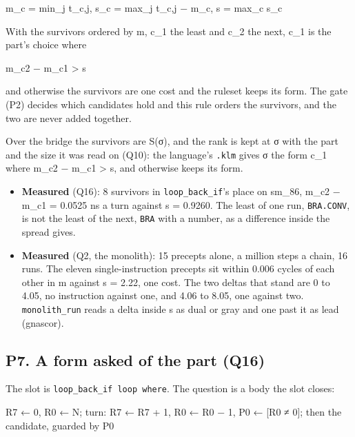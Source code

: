 m\_\allowbreak{}c = min\_\allowbreak{}j t\_\allowbreak{}c,j,  s\_\allowbreak{}c = max\_\allowbreak{}j t\_\allowbreak{}c,j − m\_\allowbreak{}c,  s = max\_\allowbreak{}c s\_\allowbreak{}c

With the survivors ordered by m, c\_\allowbreak{}1 the least and c\_\allowbreak{}2 the next, c\_\allowbreak{}1 is the part's choice where

m\_\allowbreak{}c2 − m\_\allowbreak{}c1 > s

and otherwise the survivors are one cost and the ruleset keeps its form. The gate (P2) decides which candidates hold and this rule orders the survivors, and the two are never added together.

Over the bridge the survivors are S(σ), and the rank is kept at σ with the part and the size it was read on (Q10): the language's \texttt{.\allowbreak{}klm} gives σ the form c\_\allowbreak{}1 where m\_\allowbreak{}c2 − m\_\allowbreak{}c1 > s, and otherwise keeps its form.

\begin{itemize}
\item \textbf{Measured} (Q16): 8 survivors in \texttt{loop\_\allowbreak{}back\_\allowbreak{}if}'s place on sm\_\allowbreak{}86, m\_\allowbreak{}c2 − m\_\allowbreak{}c1 = 0.0525 ns a turn against s = 0.9260. The least of one run, \texttt{BRA.\allowbreak{}CONV}, is not the least of the next, \texttt{BRA} with a number, as a difference inside the spread gives.
\item \textbf{Measured} (Q2, the monolith): 15 precepts alone, a million steps a chain, 16 runs. The eleven single-instruction precepts sit within 0.006 cycles of each other in m against s = 2.22, one cost. The two deltas that stand are 0 to 4.05, no instruction against one, and 4.06 to 8.05, one against two. \texttt{monolith\_\allowbreak{}run} reads a delta inside s as dual or gray and one past it as lead (gnascor).
\end{itemize}

\subsection{\texorpdfstring{P7. A form asked of the part (Q16)}{P7. A form asked of the part (Q16)}}

The slot is \texttt{loop\_\allowbreak{}back\_\allowbreak{}if loop where}. The question is a body the slot closes:

R7 ← 0, R0 ← N;  turn: R7 ← R7 + 1, R0 ← R0 − 1, P0 ← [R0 ≠ 0];  then the candidate, guarded by P0

